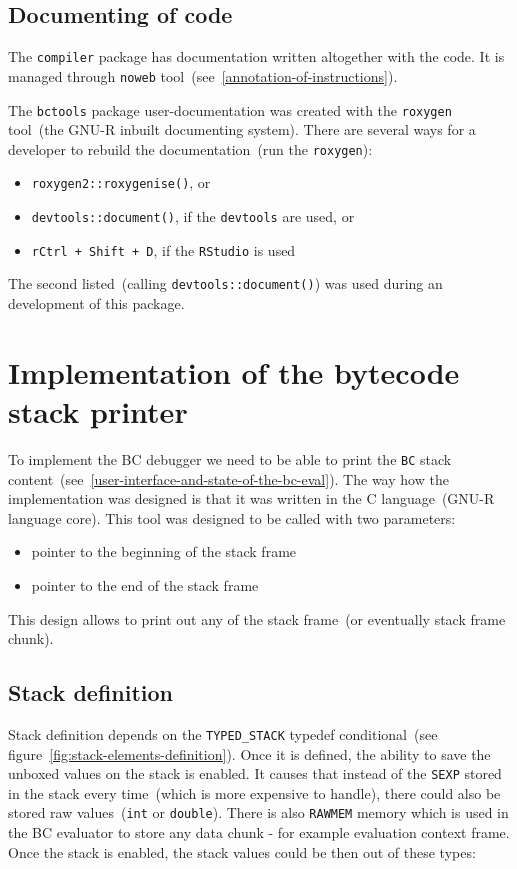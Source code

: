 \documentclass[thesis=M,english]{FITthesis}[2018/10/20]
\newcommand{\code}[1]{\texttt{#1}}
\begin{document}
\subsection{Documenting of code}

The \code{compiler} package has documentation written altogether with the code. It is managed through \code{noweb} tool~(see~\ref{annotation-of-instructions}).

The \code{bctools} package user-documentation was created with the \code{roxygen} tool~(the GNU-R inbuilt documenting system). There are several ways for a developer to rebuild the documentation~(run the \code{roxygen}):
\begin{itemize}
 \item \code{roxygen2::roxygenise()}, or
 \item \code{devtools::document()}, if the \code{devtools} are used, or
 \item \code{rCtrl + Shift + D}, if the \code{RStudio} is used
\end{itemize}

The second listed~(calling \code{devtools::document()}) was used during an development of this package.

\section{Implementation of the bytecode stack printer}\label{implementation-of-stack-printer}

To implement the BC debugger we need to be able to print the \code{BC} stack content~(see~\ref{user-interface-and-state-of-the-bc-eval}). The way how the implementation was designed is that it was written in the C language~(GNU-R language core). This tool was designed to be called with two parameters:
\begin{itemize}
	\item pointer to the beginning of the stack frame
	\item pointer to the end of the stack frame
\end{itemize}

This design allows to print out any of the stack frame~(or eventually stack frame chunk).

\subsection{Stack definition}\label{stack-definition}

Stack definition depends on the \code{TYPED{\_}STACK} typedef conditional~(see figure~\ref{fig:stack-elements-definition}). Once it is defined, the ability to save the unboxed values on the stack is enabled. It causes that instead of the \code{SEXP} stored in the stack every time~(which is more expensive to handle), there could also be stored raw values~(\code{int} or \code{double}). There is also \code{RAWMEM} memory which is used in the BC evaluator to store any data chunk - for example evaluation context frame. Once the stack is enabled, the stack values could be then out of these types:
\end{document}
